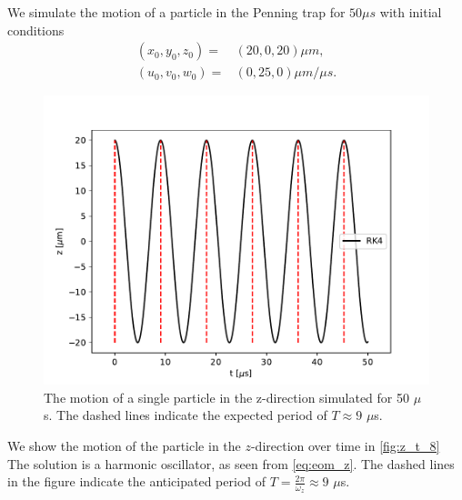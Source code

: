We simulate the motion of a particle in the Penning trap for $50 \mu s$ with initial conditions
\begin{align}
  (x_0, y_0, z_0) =& (20, 0, 20)\mu m, \\
  (u_0, v_0, w_0) =& (0, 25, 0) \mu m / \mu s.
\end{align}


\begin{figure}
\centering
\includegraphics[scale = 0.7]{../figures/z_t_.pdf}
\caption{The motion of a single particle in the z-direction simulated for 50 $\mu$s. The dashed lines indicate the expected period of $T \approx 9$ $\mu$s.}
\label{fig:z_t_8}
\end{figure}

We show the motion of the particle in the $z$-direction over time in \autoref{fig:z_t_8}
The solution is a harmonic oscillator, as seen from \autoref{eq:eom_z}. The dashed lines in the figure indicate the anticipated period of $T = \frac{2\pi}{\omega_z} \approx 9$ $\mu$s.

